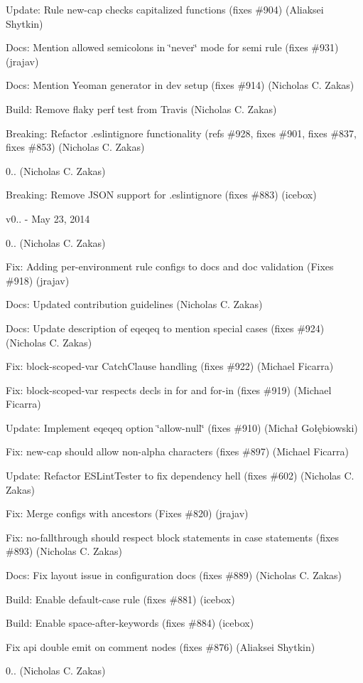\begin{DoxyItemize}
\item Update\+: Rule {\ttfamily new-\/cap} checks capitalized functions (fixes \#904) (Aliaksei Shytkin)
\item Docs\+: Mention allowed semicolons in \char`\"{}never\char`\"{} mode for \textquotesingle{}semi\textquotesingle{} rule (fixes \#931) (jrajav)
\item Docs\+: Mention Yeoman generator in dev setup (fixes \#914) (Nicholas C. Zakas)
\item Build\+: Remove flaky perf test from Travis (Nicholas C. Zakas)
\item Breaking\+: Refactor .eslintignore functionality (refs \#928, fixes \#901, fixes \#837, fixes \#853) (Nicholas C. Zakas)
\item 0.. (Nicholas C. Zakas)
\item Breaking\+: Remove J\+S\+ON support for .eslintignore (fixes \#883) (icebox)
\end{DoxyItemize}

v0.. -\/ May 23, 2014


\begin{DoxyItemize}
\item 0.. (Nicholas C. Zakas)
\item Fix\+: Adding per-\/environment rule configs to docs and doc validation (Fixes \#918) (jrajav)
\item Docs\+: Updated contribution guidelines (Nicholas C. Zakas)
\item Docs\+: Update description of eqeqeq to mention special cases (fixes \#924) (Nicholas C. Zakas)
\item Fix\+: block-\/scoped-\/var Catch\+Clause handling (fixes \#922) (Michael Ficarra)
\item Fix\+: block-\/scoped-\/var respects decls in for and for-\/in (fixes \#919) (Michael Ficarra)
\item Update\+: Implement eqeqeq option \char`\"{}allow-\/null\char`\"{} (fixes \#910) (Michał Gołębiowski)
\item Fix\+: new-\/cap should allow non-\/alpha characters (fixes \#897) (Michael Ficarra)
\item Update\+: Refactor E\+S\+Lint\+Tester to fix dependency hell (fixes \#602) (Nicholas C. Zakas)
\item Fix\+: Merge configs with ancestors (Fixes \#820) (jrajav)
\item Fix\+: no-\/fallthrough should respect block statements in case statements (fixes \#893) (Nicholas C. Zakas)
\item Docs\+: Fix layout issue in configuration docs (fixes \#889) (Nicholas C. Zakas)
\item Build\+: Enable default-\/case rule (fixes \#881) (icebox)
\item Build\+: Enable space-\/after-\/keywords (fixes \#884) (icebox)
\item Fix api double emit on comment nodes (fixes \#876) (Aliaksei Shytkin)
\item 0.. (Nicholas C. Zakas)
\end{DoxyItemize}

